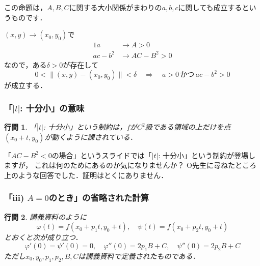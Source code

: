 \documentclass{jsarticle}
\makeatletter
\renewenvironment{proof}[1][\proofname]{\par
        \pushQED{\qed}
        \normalfont
        \topsep6\p@\@plus6\p@ \trivlist
        \item[\hskip\labelsep{\bfseries #1}\@addpunct{\bfseries}]\ignorespaces
    }{%
        \popQED\endtrivlist\@endpefalse
    }
\renewcommand{\proofname}{\underline{証明.}}
\newtheorem{proposition}{行間}
\makeatother
\begin{document}
この命題は，$A, B, C$に関する大小関係がまわりの$a, b, c$に関しても成立するというものです．

\begin{proof}
    $(x, y) \rightarrow (x_0, y_0)$で
    \begin{alignat}{1}
        a &\rightarrow A > 0 \\
        ac - b^2 &\rightarrow AC - B^2 > 0
    \end{alignat}
    なので，ある$\delta > 0$が存在して
    \begin{equation}
        0 < \| (x, y) - (x_0, y_0) \| < \delta
        \quad \Longrightarrow \quad
        a > 0
        \,\mbox{かつ}\,
        ac - b^2 > 0
    \end{equation}
    が成立する．
\end{proof}

\subsubsection{「$|t|$: 十分小」の意味}
\begin{screen}
    \begin{proposition}
        「$|t|$: 十分小」という制約は，$f$が$C^2$級である領域の上だけを点$(x_0 + t, y_0)$が動くように課されている．
    \end{proposition}
\end{screen}

「$AC-B^2<0$の場合」というスライドでは「$|t|$: 十分小」という制約が登場しますが，
これは何のためにあるのか気になりませんか？
O先生に尋ねたところ上のような回答でした．証明はとくにありません．

\subsubsection{「iii) $A=0$のとき」の省略された計算}
\begin{screen}
    \begin{proposition}
        講義資料のように
        \begin{equation}
            \varphi(t) = f(x_0 + p_1 t, y_0 + t),
            \quad
            \psi(t)    = f(x_0 + p_2 t, y_0 + t)
        \end{equation}
        とおくと次が成り立つ．
        \begin{equation}
            \varphi'(0) = \psi'(0) = 0,
            \quad
            \varphi''(0) = 2p_1 B + C,
            \quad
            \psi''(0)    = 2p_2 B + C
        \end{equation}
        ただし$x_0, y_0, p_1, p_2, B, C$は講義資料で定義されたものである．
    \end{proposition}
\end{screen}
\end{document}
